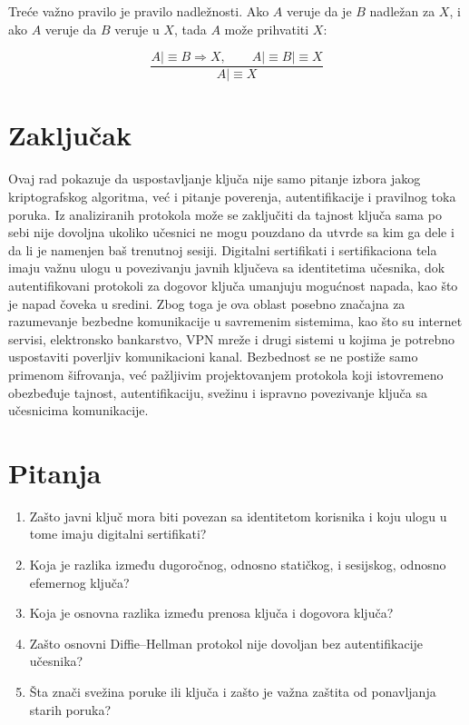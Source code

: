 Treće važno pravilo je pravilo nadležnosti. Ako \(A\) veruje da je \(B\) nadležan za \(X\), i ako \(A\) veruje da \(B\) veruje u \(X\), tada \(A\) može prihvatiti \(X\):

\[ \frac{ \displaystyle A \mid\equiv B \Rightarrow X, \qquad A \mid\equiv B \mid\equiv X }{ \displaystyle A \mid\equiv X } \]


\section{Zaključak}

Ovaj rad pokazuje da uspostavljanje ključa nije samo pitanje izbora jakog kriptografskog algoritma, već i pitanje poverenja, autentifikacije i pravilnog toka poruka. Iz analiziranih protokola može se zaključiti da tajnost ključa sama po sebi nije dovoljna ukoliko učesnici ne mogu pouzdano da utvrde sa kim ga dele i da li je namenjen baš trenutnoj sesiji. Digitalni sertifikati i sertifikaciona tela imaju važnu ulogu u povezivanju javnih ključeva sa identitetima učesnika, dok autentifikovani protokoli za dogovor ključa umanjuju mogućnost napada, kao što je napad čoveka u sredini. Zbog toga je ova oblast posebno značajna za razumevanje bezbedne komunikacije u savremenim sistemima, kao što su internet servisi, elektronsko bankarstvo, VPN mreže i drugi sistemi u kojima je potrebno uspostaviti poverljiv komunikacioni kanal. Bezbednost se ne postiže samo primenom šifrovanja, već pažljivim projektovanjem protokola koji istovremeno obezbeđuje tajnost, autentifikaciju, svežinu i ispravno povezivanje ključa sa učesnicima komunikacije.


\section{Pitanja}

\begin{enumerate}
    \item Zašto javni ključ mora biti povezan sa identitetom korisnika i koju ulogu u tome imaju digitalni sertifikati?
    
    \item Koja je razlika između dugoročnog, odnosno statičkog, i sesijskog, odnosno efemernog ključa?
    
    \item Koja je osnovna razlika između prenosa ključa i dogovora ključa?
    
    \item Zašto osnovni Diffie--Hellman protokol nije dovoljan bez autentifikacije učesnika?
    
    \item Šta znači svežina poruke ili ključa i zašto je važna zaštita od ponavljanja starih poruka?
\end{enumerate}





